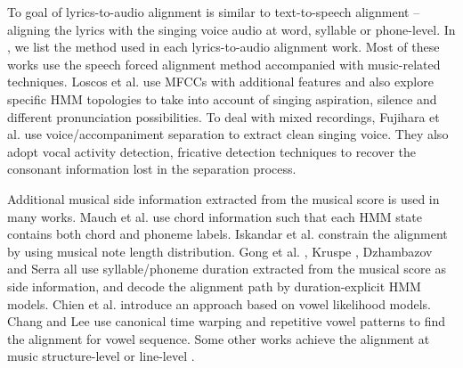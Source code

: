 To goal of lyrics-to-audio alignment is similar to text-to-speech alignment -- aligning the lyrics with the singing voice audio at word, syllable or phone-level. In , we list the method used in each lyrics-to-audio alignment work. Most of these works  use the speech forced alignment method accompanied with music-related techniques. Loscos et al. \cite{loscos1999Low} use MFCCs with additional features and also explore specific HMM topologies to take into account of singing aspiration, silence and different pronunciation possibilities. To deal with mixed recordings, Fujihara et al.  use voice/accompaniment separation to extract clean singing voice. They also adopt vocal activity detection, fricative detection techniques to recover the consonant information lost in the separation process. 

Additional musical side information extracted from the musical score is used in many works. Mauch et al.  use chord information such that each HMM state contains both chord and phoneme labels. Iskandar et al.  constrain the alignment by using musical note length distribution. Gong et al. , Kruspe , Dzhambazov and Serra  all use syllable/phoneme duration extracted from the musical score as side information, and decode the alignment path by duration-explicit HMM models. Chien et al.  introduce an approach based on vowel likelihood models. Chang and Lee  use canonical time warping and repetitive vowel patterns to find the alignment for vowel sequence. Some other works achieve the alignment at music structure-level  or line-level .

